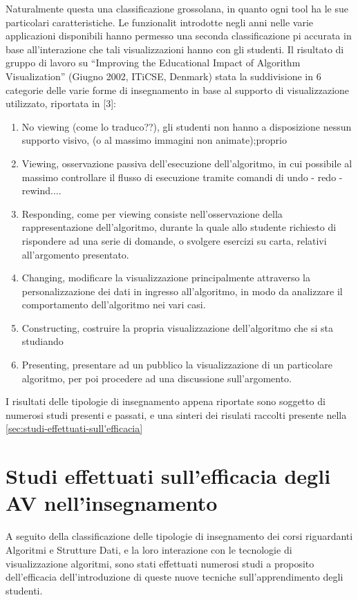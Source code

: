 Naturalmente questa una classificazione grossolana, in quanto ogni
tool ha le sue particolari caratteristiche. Le funzionalit introdotte
negli anni nelle varie applicazioni disponibili hanno permesso una
seconda classificazione pi accurata in base all'interazione che tali
visualizzazioni hanno con gli studenti. Il risultato di gruppo di
lavoro su {}``Improving the Educational Impact of Algorithm Visualization''
(Giugno 2002, ITiCSE, Denmark) stata la suddivisione in 6 categorie
delle varie forme di insegnamento in base al supporto di visualizzazione
utilizzato, riportata in {[}3{]}: 
\begin{enumerate}
\item No viewing (come lo traduco??), gli studenti non hanno a disposizione
nessun supporto visivo, (o al massimo immagini non animate);proprio 
\item Viewing, osservazione passiva dell'esecuzione dell'algoritmo, in cui
possibile al massimo controllare il flusso di esecuzione tramite comandi
di undo - redo - rewind.... 
\item Responding, come per viewing consiste nell'osservazione della rappresentazione
dell'algoritmo, durante la quale allo studente richiesto di rispondere
ad una serie di domande, o svolgere esercizi su carta, relativi all'argomento
presentato. 
\item Changing, modificare la visualizzazione principalmente attraverso
la personalizzazione dei dati in ingresso all'algoritmo, in modo da
analizzare il comportamento dell'algoritmo nei vari casi. 
\item Constructing, costruire la propria visualizzazione dell'algoritmo
che si sta studiando 
\item Presenting, presentare ad un pubblico la visualizzazione di un particolare
algoritmo, per poi procedere ad una discussione sull'argomento. 
\end{enumerate}
I risultati delle tipologie di insegnamento appena riportate sono
soggetto di numerosi studi presenti e passati, e una sinteri dei risulati
raccolti presente nella \ref{sec:studi-effettuati-sull'efficacia}


\section{\label{sec:studi-effettuati-sull'efficacia}Studi effettuati sull'efficacia
degli AV nell'insegnamento}

A seguito della classificazione delle tipologie di insegnamento dei
corsi riguardanti Algoritmi e Strutture Dati, e la loro interazione
con le tecnologie di visualizzazione algoritmi, sono stati effettuati
numerosi studi a proposito dell'efficacia dell'introduzione di queste
nuove tecniche sull'apprendimento degli studenti.

